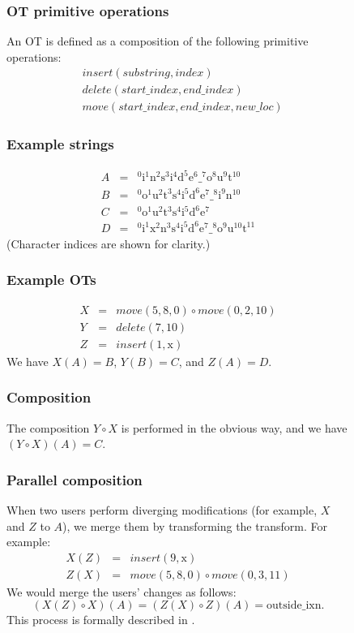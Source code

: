 \documentclass[11pt,titlepage]{article}
\begin{document}
\begin{figure}[h]
  \centering
  \begin{minipage}{\textwidth}
    \begin{multicols}{2}
      \setlength{\parskip}{-6pt}
      \subsubsection*{OT primitive operations}
      An OT is defined as a composition of the following primitive
      operations:
      \begin{eqnarray*}
        &insert(substring, index) \\
        &delete(start\_index, end\_index) \\
        &move(start\_index, end\_index, new\_loc)
      \end{eqnarray*}      
      \subsubsection*{Example strings}
      \begin{eqnarray*}
        A &=& \mathrm{^0i^1n^2s^3i^4d^5e^6\_^7o^8u^9t^{10}} \\
        B &=& \mathrm{^0o^1u^2t^3s^4i^5d^6e^7\_^8i^9n^{10}} \\
        C &=& \mathrm{^0o^1u^2t^3s^4i^5d^6e^7} \\
        D &=& \mathrm{^0i^1x^2n^3s^4i^5d^6e^7\_^8o^9u^{10}t^{11}}
      \end{eqnarray*}
      (Character indices are shown for clarity.)
      \subsubsection*{Example OTs}
      \begin{eqnarray*}
        X &=& move(5, 8, 0) \circ move(0, 2, 10) \\
        Y &=& delete(7, 10) \\
        Z &=& insert(1, \mathrm{x})
      \end{eqnarray*}
      We have \(X(A) = B\), \(Y(B) = C\), and \(Z(A) = D\).
      \subsubsection*{Composition}
      The composition \(Y \circ X\) is performed in the obvious way,
      and we have \((Y \circ X)(A) = C\).
      \subsubsection*{Parallel composition}
      When two users perform diverging modifications (for example,
      \(X\) and \(Z\) to \(A\)), we merge them by transforming the
      transform.  For example:
      \begin{eqnarray*}
        X(Z) &=& insert(9, \mathrm{x}) \\
        Z(X) &=& move(5, 8, 0) \circ move(0, 3, 11)
      \end{eqnarray*}
      We would merge the users' changes as follows: \[(X(Z) \circ
      X)(A) = (Z(X) \circ Z)(A) = \mathrm{outside\_ixn}.\] This
      process is formally described in \cite{ot}.

\end{multicols}
\end{minipage}
\end{figure}
\end{document}
